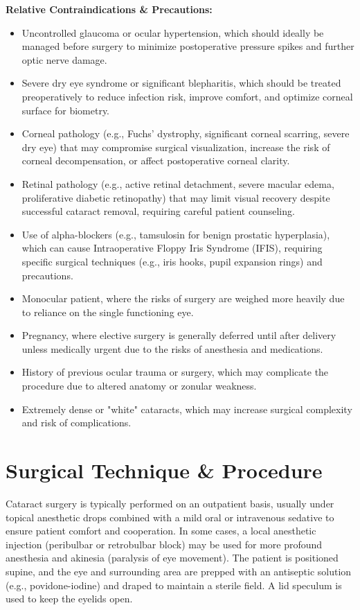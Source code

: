 \textbf{Relative Contraindications \& Precautions:}

\begin{itemize}
  \item Uncontrolled glaucoma or ocular hypertension, which should ideally be managed before surgery to minimize postoperative pressure spikes and further optic nerve damage.
  \item Severe dry eye syndrome or significant blepharitis, which should be treated preoperatively to reduce infection risk, improve comfort, and optimize corneal surface for biometry.
  \item Corneal pathology (e.g., Fuchs' dystrophy, significant corneal scarring, severe dry eye) that may compromise surgical visualization, increase the risk of corneal decompensation, or affect postoperative corneal clarity.
  \item Retinal pathology (e.g., active retinal detachment, severe macular edema, proliferative diabetic retinopathy) that may limit visual recovery despite successful cataract removal, requiring careful patient counseling.
  \item Use of alpha-blockers (e.g., tamsulosin for benign prostatic hyperplasia), which can cause Intraoperative Floppy Iris Syndrome (IFIS), requiring specific surgical techniques (e.g., iris hooks, pupil expansion rings) and precautions.
  \item Monocular patient, where the risks of surgery are weighed more heavily due to reliance on the single functioning eye.
  \item Pregnancy, where elective surgery is generally deferred until after delivery unless medically urgent due to the risks of anesthesia and medications.
  \item History of previous ocular trauma or surgery, which may complicate the procedure due to altered anatomy or zonular weakness.
  \item Extremely dense or "white" cataracts, which may increase surgical complexity and risk of complications.
\end{itemize}

\section*{Surgical Technique \& Procedure}
Cataract surgery is typically performed on an outpatient basis, usually under topical anesthetic drops combined with a mild oral or intravenous sedative to ensure patient comfort and cooperation. In some cases, a local anesthetic injection (peribulbar or retrobulbar block) may be used for more profound anesthesia and akinesia (paralysis of eye movement). The patient is positioned supine, and the eye and surrounding area are prepped with an antiseptic solution (e.g., povidone-iodine) and draped to maintain a sterile field. A lid speculum is used to keep the eyelids open.

